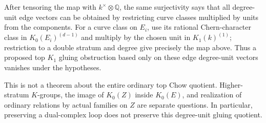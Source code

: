 After tensoring the map with $k^\times\otimes\mathbb Q$, the same
surjectivity says that all degree-unit edge vectors can be obtained
by restricting curve classes multiplied by units from the components.
For a curve class on $E_i$, use its rational Chern-character class in
$K_0(E_i)^{(d-1)}$ and multiply by the chosen unit in $K_1(k)^{(1)}$;
restriction to a double stratum and degree give precisely the map
above. Thus a proposed top $K_1$ gluing obstruction based only on
these edge degree-unit vectors vanishes under the hypotheses.

This is not a theorem about the entire ordinary top Chow quotient.
Higher-stratum $K$-groups, the image of $K_0(Z)$ inside $K_0(E)$,
and realization of ordinary relations by actual families on $Z$
are separate questions. In particular, preserving a dual-complex
loop does not preserve this degree-unit gluing quotient.
